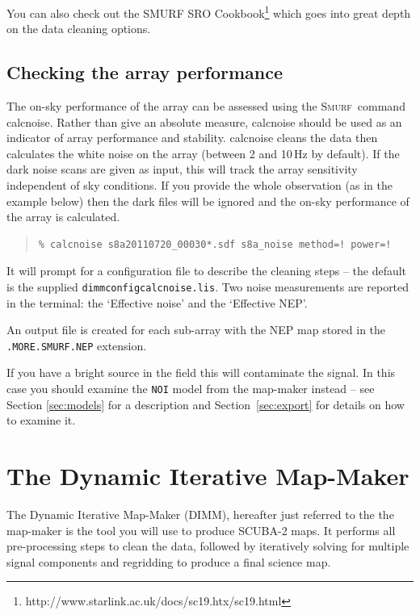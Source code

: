 \documentclass[twoside,11pt]{article}
\newcommand{\xref}[3]{#1}
\newcommand{\xlabel}[1]{}
\renewcommand{\_}{\texttt{\symbol{95}}}
\newenvironment{myquote}{\begin{quote}\begin{small}}{\end{small}\end{quote}}
\newcommand{\smurf}{\xref{\textsc{Smurf}}{sun258}{}}
\newcommand{\task}[1]{\textsf{#1}}
\newcommand{\calcnoise}{\xref{\task{calcnoise}}{sun258}{CALCNOISE}}
\begin{document}
You can also check out the SMURF SRO
Cookbook\footnote{http://www.starlink.ac.uk/docs/sc19.htx/sc19.html}
which goes into great depth on the data cleaning options.


\subsection{\xlabel{calcnoise}Checking the array performance}
\label{sec:calcnoise}

The on-sky performance of the array can be assessed using the \smurf\
command \calcnoise. Rather than give an absolute measure, \task{calcnoise}
should be used as an indicator of array performance and stability.
\task{calcnoise} cleans the data then calculates the
white noise on the array (between 2 and 10\,Hz by default). If the
dark noise scans are given as input, this will track the array
sensitivity independent of sky conditions. If you provide the whole
observation (as in the example below) then the dark files will be
ignored and the on-sky performance of the array is calculated.

\begin{myquote}
\begin{verbatim}
% calcnoise s8a20110720_00030*.sdf s8a_noise method=! power=!
\end{verbatim}
\end{myquote}
It will prompt for a configuration file to describe the cleaning
steps -- the default is the supplied \texttt{dimmconfig\_calcnoise.lis}.
Two noise measurements are reported in the terminal: the
`Effective noise' and the `Effective NEP'.

An output file is created for each sub-array with the NEP map stored
in the \texttt{.MORE.SMURF.NEP} extension.

If you have a bright source in the field this will
contaminate the signal. In this case you should examine the
\texttt{NOI} model from the map-maker instead -- see Section
\ref{sec:models} for a description and Section~\ref{sec:export} for
details on how to examine it.

\clearpage
\section{\xlabel{dimm}The Dynamic Iterative Map-Maker}
\label{sec:dimm}

The Dynamic Iterative Map-Maker (DIMM), hereafter just referred to the
the map-maker is the tool you will use to produce SCUBA-2 maps. It
performs all pre-processing steps to clean the data, followed by
iteratively solving for multiple signal components and regridding to
produce a final science map.
\end{document}
